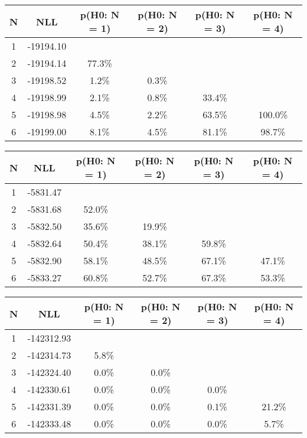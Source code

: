 \begin{table}[htb]
	\begin{center}
{\footnotesize\renewcommand{\arraystretch}{1.4}
		\begin{tabular}{cc||cccc}
			N & NLL & p(H0: N = 1) & p(H0: N = 2) & p(H0: N = 3) & p(H0: N = 4)\\ 
		\hline
1 & -19194.10 & & & & \\
2 & -19194.14 & 77.3\% & & & \\
3 & -19198.52 & 1.2\% & 0.3\% & & \\
4 & -19198.99 & 2.1\% & 0.8\% & 33.4\% & \\
5 & -19198.98 & 4.5\% & 2.2\% & 63.5\% & 100.0\% \\
6 & -19199.00 & 8.1\% & 4.5\% & 81.1\% & 98.7\% \\
	\end{tabular}
		\label{tab:lab}
	}
	\end{center}\end{table}

\begin{table}[htb]
	\begin{center}
{\footnotesize\renewcommand{\arraystretch}{1.4}
		\begin{tabular}{cc||cccc}
			N & NLL & p(H0: N = 1) & p(H0: N = 2) & p(H0: N = 3) & p(H0: N = 4)\\ 
		\hline
1 & -5831.47 & & & & \\
2 & -5831.68 & 52.0\% & & & \\
3 & -5832.50 & 35.6\% & 19.9\% & & \\
4 & -5832.64 & 50.4\% & 38.1\% & 59.8\% & \\
5 & -5832.90 & 58.1\% & 48.5\% & 67.1\% & 47.1\% \\
6 & -5833.27 & 60.8\% & 52.7\% & 67.3\% & 53.3\% \\
	\end{tabular}
		\label{tab:lab}
	}
	\end{center}\end{table}

\begin{table}[htb]
	\begin{center}
{\footnotesize\renewcommand{\arraystretch}{1.4}
		\begin{tabular}{cc||cccc}
			N & NLL & p(H0: N = 1) & p(H0: N = 2) & p(H0: N = 3) & p(H0: N = 4)\\ 
		\hline
1 & -142312.93 & & & & \\
2 & -142314.73 & 5.8\% & & & \\
3 & -142324.40 & 0.0\% & 0.0\% & & \\
4 & -142330.61 & 0.0\% & 0.0\% & 0.0\% & \\
5 & -142331.39 & 0.0\% & 0.0\% & 0.1\% & 21.2\% \\
6 & -142333.48 & 0.0\% & 0.0\% & 0.0\% & 5.7\% \\
	\end{tabular}
		\label{tab:lab}
	}
	\end{center}\end{table}

